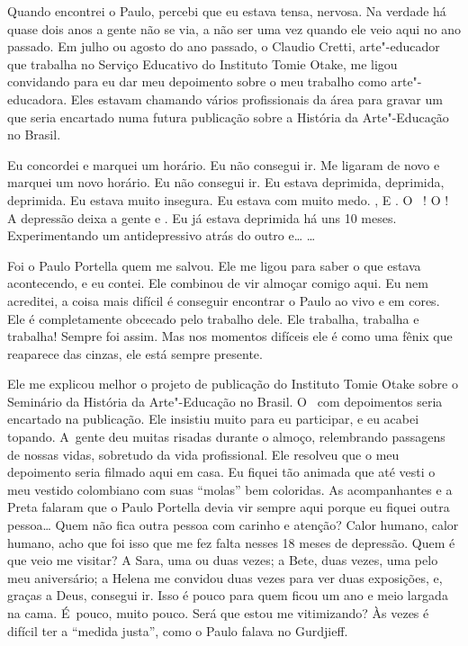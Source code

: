 Quando encontrei o Paulo, percebi que eu estava tensa, nervosa. Na
verdade há quase dois anos a gente não se via, a não ser uma vez quando
ele veio aqui no ano passado. Em julho ou agosto do ano passado, o
Claudio Cretti, arte"-educador que trabalha no Serviço Educativo do
Instituto Tomie Otake, me ligou convidando para eu dar meu depoimento
sobre o meu trabalho como arte"-educadora. Eles estavam chamando vários
profissionais da área para gravar um  que seria encartado numa futura
publicação sobre a História da Arte"-Educação no Brasil.

Eu concordei e marquei um horário. Eu não consegui ir. Me ligaram de
novo e marquei um novo horário. Eu não consegui ir. Eu estava deprimida,
deprimida, deprimida. Eu estava muito insegura. Eu estava com muito
medo.    ,       E
  . O~   ! O    
 ! A depressão deixa a gente  e . Eu já estava
deprimida há uns 10 meses. Experimentando um antidepressivo atrás do
outro e… …

Foi o Paulo Portella quem me salvou. Ele me ligou para saber o que
estava acontecendo, e eu contei. Ele combinou de vir almoçar comigo
aqui. Eu nem acreditei, a coisa mais difícil é conseguir encontrar o
Paulo ao vivo e em cores. Ele é completamente obcecado pelo trabalho
dele. Ele trabalha, trabalha e trabalha! Sempre foi assim. Mas nos
momentos difíceis ele é como uma fênix que reaparece das cinzas, ele
está sempre presente.

Ele me explicou melhor o projeto de publicação do Instituto Tomie Otake
sobre o Seminário da História da Arte"-Educação no Brasil. O~ com
depoimentos seria encartado na publicação. Ele insistiu muito para eu
participar, e eu acabei topando. A~gente deu muitas risadas durante o
almoço, relembrando passagens de nossas vidas, sobretudo da vida
profissional. Ele resolveu que o meu depoimento seria filmado aqui em
casa. Eu fiquei tão animada que até vesti o meu vestido colombiano com
suas ``molas'' bem coloridas. As acompanhantes e a Preta falaram que o
Paulo Portella devia vir sempre aqui porque eu fiquei outra
pessoa… Quem não fica outra pessoa com carinho e atenção? Calor
humano, calor humano, acho que foi isso que me fez falta nesses 18 meses
de depressão. Quem é que veio me visitar? A Sara, uma ou duas vezes; a
Bete, duas vezes, uma pelo meu aniversário; a Helena me convidou duas
vezes para ver duas exposições, e, graças a Deus, consegui ir. Isso é
pouco para quem ficou um ano e meio largada na cama. É~pouco, muito
pouco. Será que estou me vitimizando? Às vezes é difícil ter a ``medida
justa'', como o Paulo falava no Gurdjieff.

